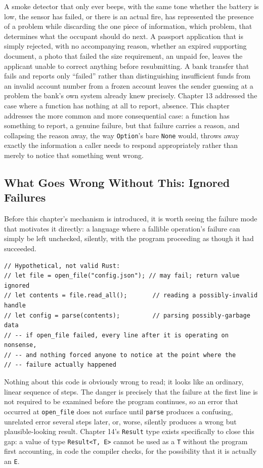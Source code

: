 \documentclass[11pt]{book}
\begin{document}
A smoke detector that only ever beeps, with the same tone whether the battery is low, the sensor has failed, or there is an actual fire, has represented the presence of a problem while discarding the one piece of information, which problem, that determines what the occupant should do next. A passport application that is simply rejected, with no accompanying reason, whether an expired supporting document, a photo that failed the size requirement, an unpaid fee, leaves the applicant unable to correct anything before resubmitting. A bank transfer that fails and reports only ``failed'' rather than distinguishing insufficient funds from an invalid account number from a frozen account leaves the sender guessing at a problem the bank's own system already knew precisely. Chapter 13 addressed the case where a function has nothing at all to report, absence. This chapter addresses the more common and more consequential case: a function has something to report, a genuine failure, but that failure carries a reason, and collapsing the reason away, the way \texttt{Option}'s bare \texttt{None} would, throws away exactly the information a caller needs to respond appropriately rather than merely to notice that something went wrong.

\subsection*{What Goes Wrong Without This: Ignored Failures}

Before this chapter's mechanism is introduced, it is worth seeing the failure mode that motivates it directly: a language where a fallible operation's failure can simply be left unchecked, silently, with the program proceeding as though it had succeeded.

\begin{lstlisting}
// Hypothetical, not valid Rust:
// let file = open_file("config.json"); // may fail; return value ignored
// let contents = file.read_all();       // reading a possibly-invalid handle
// let config = parse(contents);         // parsing possibly-garbage data
// -- if open_file failed, every line after it is operating on nonsense,
// -- and nothing forced anyone to notice at the point where the
// -- failure actually happened
\end{lstlisting}

Nothing about this code is obviously wrong to read; it looks like an ordinary, linear sequence of steps. The danger is precisely that the failure at the first line is not required to be examined before the program continues, so an error that occurred at \texttt{open\_file} does not surface until \texttt{parse} produces a confusing, unrelated error several steps later, or, worse, silently produces a wrong but plausible-looking result. Chapter 14's \texttt{Result} type exists specifically to close this gap: a value of type \texttt{Result<T, E>} cannot be used as a \texttt{T} without the program first accounting, in code the compiler checks, for the possibility that it is actually an \texttt{E}.
\end{document}
